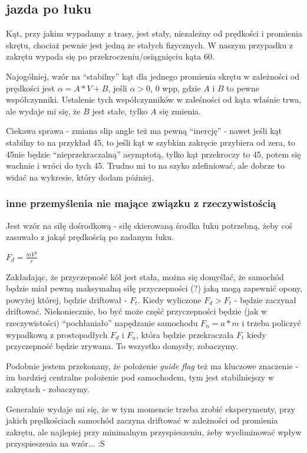 \documentclass[12pt]{article}
\begin{document}
\subsection{jazda po łuku}

Kąt, przy jakim wypadamy z trasy, jest stały, niezależny od prędkości i promienia skrętu, chociaż pewnie jest jedną ze stałych fizycznych. W naszym przypadku z zakrętu wypada się po przekroczeniu/osiągnięciu kąta 60\textdegree.

Najogólniej, wzór na ``stabilny'' kąt dla jednego promienia skrętu w zależności od prędkości jest $\alpha = A * V + B$, jeśli $\alpha>0$, $0$ wpp, gdzie $A$ i $B$ to pewne współczynniki. Ustalenie tych współczynników w zaleśności od kąta właśnie trwa, ale wydaje mi się, że $B$ jest stałe, tylko $A$ się zmienia.

Ciekawa sprawa - zmiana slip angle też ma pewną ``inercję'' - nawet jeśli kąt stabilny to na przykład 45\textdegree, to jeśli kąt w szybkim zakręcie przybiera od zera, to 45\textdegree nie będzie ``nieprzekraczalną'' asymptotą, tylko kąt przekroczy to 45\textdegree, potem się wachnie i wróci do tych 45\textdegree. Trudno mi to na szyko zdefiniować, ale dobrze to widać na wykresie, który dodam później.

\subsubsection{inne przemyślenia nie mające związku z rzeczywistością}

Jest wzór na siłę dośrodkową - siłę skierowaną środka łuku potrzebną, żeby coś zasuwało z jakąś prędkością po zadanym łuku. 

$F_d = \frac{mV^2}{r}$

Zakładając, że przyczepność kół jest stała, można się domyślać, że samochód będzie miał pewną maksymalną siłę przyczepności (?) jaką mogą zapewnić opony, powyżej której, będzie driftował - $F_t$. Kiedy wyliczone $F_d > F_t$ - będzie zaczynał driftować. Niekoniecznie, bo być może część przyczepności będzie (jak w rzeczywistości) ``pochłaniało'' napędzanie samochodu $F_n = a * m$ i trzeba policzyć wypadkową z prostopadłych $F_d$ i $F_n$, która będzie przekraczała $F_t$ kiedy przyczepność będzie zrywana. To wszystko domysły, zobaczymy.

Podobnie jestem przekonany, że położenie \textit{guide flag} też ma kluczowe znaczenie - im bardziej centralne położenie pod samochodem, tym jest stabilniejszy w zakrętach - zobaczymy.

Generalnie wydaje mi się, że w tym momencie trzeba zrobić eksperymenty, przy jakich prędkościach samochód zaczyna driftować w zależności od promienia zakrętu, ale najlepiej przy minimalnym przyspieszeniu, żeby wyeliminować wpływ przyspieszenia na wzór... :S
\end{document}
